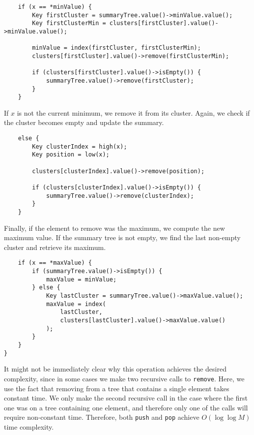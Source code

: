 \begin{verbatim}
    if (x == *minValue) {
        Key firstCluster = summaryTree.value()->minValue.value();
        Key firstClusterMin = clusters[firstCluster].value()->minValue.value();

        minValue = index(firstCluster, firstClusterMin);
        clusters[firstCluster].value()->remove(firstClusterMin);

        if (clusters[firstCluster].value()->isEmpty()) {
            summaryTree.value()->remove(firstCluster);
        }
    }
\end{verbatim}

If \( x \) is not the current minimum, we remove it from its cluster. Again, we check if the cluster becomes empty and update the summary.

\begin{verbatim}
    else {
        Key clusterIndex = high(x);
        Key position = low(x);

        clusters[clusterIndex].value()->remove(position);

        if (clusters[clusterIndex].value()->isEmpty()) {
            summaryTree.value()->remove(clusterIndex);
        }
    }
\end{verbatim}

Finally, if the element to remove was the maximum, we compute the new maximum value. If the summary tree is not empty, we find the last non-empty cluster and retrieve its maximum.

\begin{verbatim}
    if (x == *maxValue) {
        if (summaryTree.value()->isEmpty()) {
            maxValue = minValue;
        } else {
            Key lastCluster = summaryTree.value()->maxValue.value();
            maxValue = index(
                lastCluster, 
                clusters[lastCluster].value()->maxValue.value()
            );
        }
    }
}
\end{verbatim}

It might not be immediately clear why this operation achieves the desired complexity, since in some cases we make two recursive calls to \texttt{remove}. Here, we use the fact that removing from a tree that contains a single element takes constant time. We only make the second recursive call in the case where the first one was on a tree containing one element, and therefore only one of the calls will require non-constant time. Therefore, both \texttt{push} and \texttt{pop} achieve \( O(\log \log M) \) time complexity.
